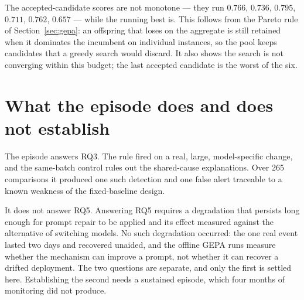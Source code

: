 The accepted-candidate scores are not monotone --- they run $0.766$, $0.736$, $0.795$, $0.711$, $0.762$, $0.657$ --- while the running best is. This follows from the Pareto rule of Section~\ref{sec:gepa}: an offspring that loses on the aggregate is still retained when it dominates the incumbent on individual instances, so the pool keeps candidates that a greedy search would discard. It also shows the search is not converging within this budget; the last accepted candidate is the worst of the six.

\section{What the episode does and does not establish}

The episode answers RQ3. The rule fired on a real, large, model-specific change, and the same-batch control rules out the shared-cause explanations. Over 265 comparisons it produced one such detection and one false alert traceable to a known weakness of the fixed-baseline design.

It does not answer RQ5. Answering RQ5 requires a degradation that persists long enough for prompt repair to be applied and its effect measured against the alternative of switching models. No such degradation occurred: the one real event lasted two days and recovered unaided, and the offline GEPA runs measure whether the mechanism can improve a prompt, not whether it can recover a drifted deployment. The two questions are separate, and only the first is settled here. Establishing the second needs a sustained episode, which four months of monitoring did not produce.
